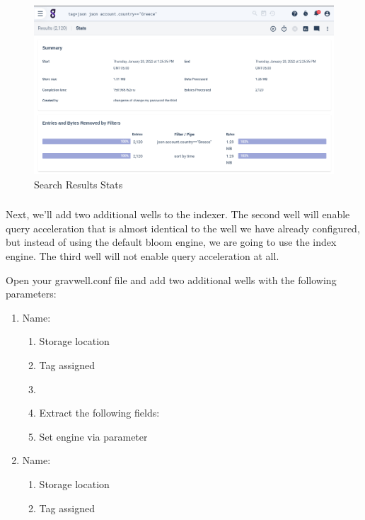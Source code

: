 {\begin{figure}
	\includegraphics{images/stats-accel.png}
	\caption{Search Results Stats}
	\label{fig:stats-accel}
\end{figure}

\hypertarget{h.cpnsaxr7kale}{%
\subsubsection{\texorpdfstring{{}}{}}\label{h.cpnsaxr7kale}}

\clearpage
Next, we'll add two additional wells to the indexer.
The second well will enable query acceleration that is almost identical
to the well we have already configured, but instead of using the default
bloom engine, we are going to use the index engine. The third well will
not enable query acceleration at all.

Open your gravwell.conf file and add two additional wells with the
following parameters:

\begin{enumerate}
	\item Name: 
	\begin{enumerate}
		\item Storage location 
		\item Tag  assigned
		\item {}
		\item Extract the following fields: 
		\item Set engine via  parameter
	\end{enumerate}
	\item Name: 
	\begin{enumerate}
		\item Storage location 
		\item Tag  assigned
	\end{enumerate}
\end{enumerate}

}
